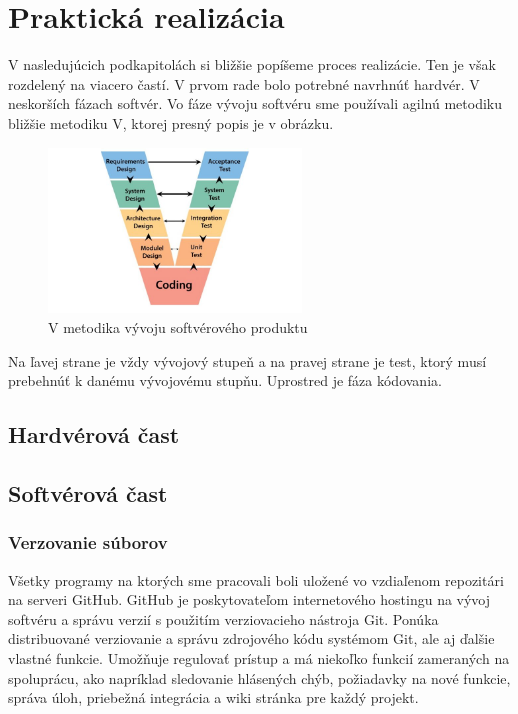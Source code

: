 \chapter{Praktická realizácia}
V nasledujúcich podkapitolách si bližšie popíšeme proces realizácie. Ten je však rozdelený na viacero častí. V prvom rade bolo potrebné navrhnúť hardvér. V neskorších fázach softvér. Vo fáze vývoju softvéru sme používali agilnú metodiku bližšie metodiku V, ktorej presný popis je v obrázku.

\begin{figure}[h!]
    \centering
    \includegraphics[width=0.6\textwidth]{obrazky/V_model.jpg}
    \caption{V metodika vývoju softvérového produktu}
\end{figure}
Na ľavej strane je vždy vývojový stupeň a na pravej strane je test, ktorý musí prebehnúť k danému vývojovému stupňu. Uprostred je fáza kódovania. 

\section{Hardvérová čast}
\section{Softvérová čast}
\subsection{Verzovanie súborov}
Všetky programy na ktorých sme pracovali boli uložené vo vzdiaľenom repozitári na serveri GitHub. GitHub je poskytovateľom internetového hostingu na vývoj softvéru a správu verzií s použitím verziovacieho nástroja Git. Ponúka distribuované verziovanie a správu zdrojového kódu systémom Git, ale aj ďalšie vlastné funkcie. Umožňuje regulovať prístup a má niekoľko funkcií zameraných na spoluprácu, ako napríklad sledovanie hlásených chýb, požiadavky na nové funkcie, správa úloh, priebežná integrácia a wiki stránka pre každý projekt.
